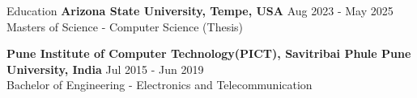 \documentclass{resume} %
\begin{document}
\begin{rSection}{Education}
                        \textbf{Arizona State University, Tempe, USA} \hfill {Aug 2023 - May 2025} \\
                            {Masters of Science {-} Computer Science (Thesis)}
                         
             
         
                        \textbf{Pune Institute of Computer Technology(PICT), Savitribai Phule Pune University, India} \hfill {Jul 2015 - Jun 2019} \\
                            {Bachelor of Engineering {-} Electronics and Telecommunication}
                         
             
         
    \end{rSection}
\end{document}
